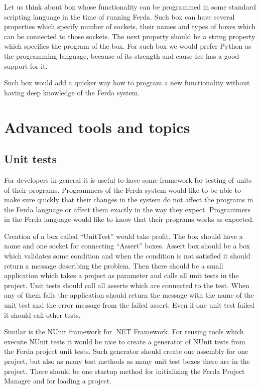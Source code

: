 \documentclass[a4paper,12pt]{book}
\begin{document}
Let us think about box whose functionality can be programmed in some standard scripting language in the time of running Ferda. Such box can have several properties which specify number of sockets, their names and types of boxes which can be connected to those sockets. The next property should be a string property which specifies the program of the box. For such box we would prefer Python as the programming language, because of its strength and cause Ice has a good support for it.

Such box would add a quicker way how to program a new functionality without having deep knowledge of the Ferda system. 

\section{Advanced tools and topics}

\subsection{Unit tests}
For developers in general it is useful to have some framework for testing of units of their programs. Programmers of the Ferda system would like to be able to make sure quickly that their changes in the system do not affect the programs in the Ferda language or affect them exactly in the way they expect. Programmers in the Ferda language would like to know that their programs works as expected.

Creation of a box called ``UnitTest'' would take profit. The box should have a name and one socket for connecting ``Assert'' boxes. Assert box should be a box which validates some condition and when the condition is not satisfied it should return a message describing the problem. Then there should be a small application which takes a project as parameter and calls all unit tests in the project. Unit tests should call all asserts which are connected to the test. When any of them fails the application should return the message with the name of the unit test and the error message from the failed assert. Even if one unit test failed it should call other tests.

Similar is the NUnit framework for .NET Framework. For reusing tools which execute NUnit tests it would be nice to create a generator of NUnit tests from the Ferda project unit tests. Such generator should create one assembly for one project, but also as many test methods as many unit test boxes there are in the project. There should be one startup method for initializing the Ferda Project Manager and for loading a project. 
\end{document}
